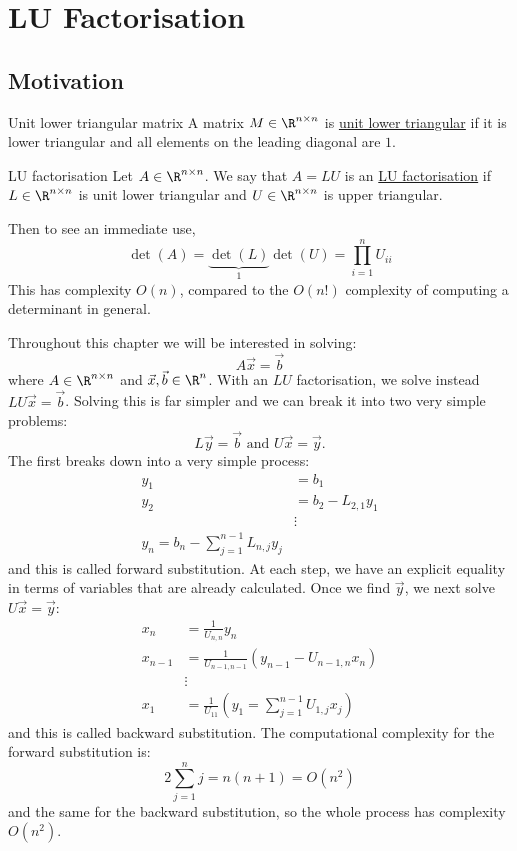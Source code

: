 \documentclass[../Main.tex]{subfiles}
\begin{document}
\section{LU Factorisation}
\subsection{Motivation}
\begin{definition}{Unit lower triangular matrix}
    A matrix $M \in \R^{n \times n}$ is \underline{unit lower triangular} if it is lower triangular and all elements on the leading diagonal are $1$.
\end{definition}
\begin{definition}{LU factorisation}
    Let $A \in \R^{n \times n}$. We say that $A = L U$ is an \underline{LU factorisation} if $L \in \R^{n \times n}$ is unit lower triangular and $U \in \R^{n \times n}$ is upper triangular.
\end{definition}
Then to see an immediate use,
\begin{equation*}
    \det(A) = \underbrace{\det(L)}_{1} \det(U) = \prod_{i=1}^{n} U_{ii}
\end{equation*}
This has complexity $O(n)$, compared to the $O(n!)$ complexity of computing a determinant in general.

Throughout this chapter we will be interested in solving:
\begin{equation}
    A \vec{x} = \vec{b}
    \label{eqnLinearSystemEqs}
\end{equation}
where $A \in \R^{n \times n}$ and $\vec{x}, \vec{b} \in \R^n$. With an $LU$ factorisation, we solve instead $LU \vec{x} = \vec{b}$. Solving this is far simpler and we can break it into two very simple problems:
\begin{equation*}
    L\vec{y} = \vec{b} \text{ and } U\vec{x} = \vec{y}.
\end{equation*}
The first breaks down into a very simple process:
\begin{align*}
    y_1 &= b_1 \\
    y_2 &= b_2 - L_{2,1} y_1 \\
    &\vdots\\
    y_n = b_n - \sum_{j=1}^{n-1} L_{n,j} y_j
\end{align*}
and this is called forward substitution. At each step, we have an explicit equality in terms of variables that are already calculated. Once we find $\vec{y}$, we next solve $U\vec{x} = \vec{y}$:
\begin{align*}
    x_n &= \frac{1}{U_{n, n}} y_n \\
    x_{n-1} &= \frac{1}{U_{n-1, n-1}} (y_{n-1} - U_{n-1, n} x_n) \\
    &\vdots\\
    x_1 &= \frac{1}{U_{11}} \left(y_1 = \sum_{j=1}^{n-1} U_{1, j} x_j\right)
\end{align*}
and this is called backward substitution. The computational complexity for the forward substitution is:
\begin{equation*}
    2\sum_{j=1}^{n} j = n(n+1) = O(n^2)
\end{equation*}
and the same for the backward substitution, so the whole process has complexity $O(n^2)$.
\end{document}
